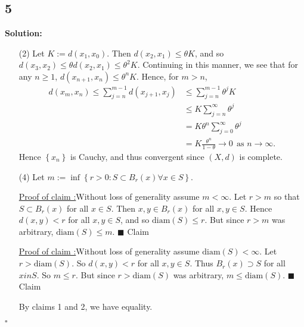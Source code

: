 \documentclass[12pt]{article}
\newcounter{ProofCounter}
\newcounter{ClaimCounter}[ProofCounter]
\newenvironment{Solution}{\stepcounter{ProofCounter}\textbf{Solution:}}{\hfill$\square$}
\newenvironment{claim}[1]{\vspace{1mm}\stepcounter{ClaimCounter}\par\noindent\underline{\bf Claim \theClaimCounter:}\space#1}{}
\newenvironment{claimproof}[1]{\par\noindent\underline{Proof of claim \theClaimCounter:}\space#1}{\hfill $\blacksquare$ Claim \theClaimCounter}
\begin{document}
\subsection*{5}
\begin{Solution}
  \begin{enumerate}
    \item[(2)] Let $K := d(x_1, x_0)$. Then $d(x_2, x_1) \leq \theta K$, and so $d(x_3, x_2) \leq \theta d(x_2, x_1) \leq \theta^{2} K$. Continuing in
      this manner, we see that for any $n \geq 1$, $d(x_{n+1}, x_{n}) \leq \theta^{n} K$. Hence, for $m > n$,
      \begin{align*}
        d(x_m, x_n) \leq \sum_{j=n}^{m-1}d(x_{j+1}, x_j) & \leq \sum_{j=n}^{m-1}\theta^{j}K \\
        & \leq K\sum_{j=n}^{\infty}\theta^{j} \\
        & = K\theta^{n}\sum_{j=0}^{\infty}\theta^{j} \\
        & = K\frac{\theta^{n}}{1 - \theta} \rightarrow 0 \ \ \text{as } n \rightarrow \infty.
      \end{align*}
      Hence $\left\{ x_n \right\}$ is Cauchy, and thus convergent since $(X,d)$ is complete.

    \item[(4)] Let $m := \inf\left\{ r > 0 : S\subset B_{r}(x) \forall x \in S \right\}$.

      \begin{claimproof}
        Without loss of generality assume $m < \infty$. Let $r > m$ so that $S \subset B_{r}(x)$ for all $x \in S$. Then $x,y \in B_{r}(x)$ for all
        $x,y \in S$. Hence $d(x,y) < r$ for all $x,y \in S$, and so $\text{diam}(S) \leq r$. But since $r > m$ was arbitrary, $\text{diam}(S) \leq m$.
      \end{claimproof}

      \begin{claimproof}
        Without loss of generality assume $\text{diam}(S) < \infty$. Let $r > \text{diam}(S)$. So $d(x,y) < r$ for all $x,y \in S$. Thus $B_{r}(x)
        \supset S$ for all $x in S$. So $m \leq r$. But since $r > \text{diam}(S)$ was arbitrary, $m \leq \text{diam}(S)$.
      \end{claimproof}

      By claims 1 and 2, we have equality.
  \end{enumerate}
\end{Solution}
\end{document}
